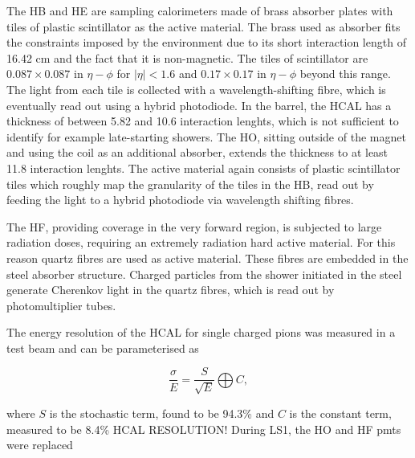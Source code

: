 The \ac{HB} and \ac{HE} are sampling calorimeters made of brass absorber
plates with tiles of plastic scintillator as the active material. The brass used as 
absorber fits the constraints imposed by the environment due to its short interaction length
of 16.42 cm and the fact that it is non-magnetic. The tiles of scintillator 
are $0.087 \times 0.087$ in $\eta-\phi$ for $|\eta|<1.6$ and $0.17\times0.17$ in $\eta-\phi$
beyond this range. 
The light from each tile is collected with a wavelength-shifting fibre, 
which is eventually read out using a hybrid photodiode. In the barrel, the \ac{HCAL}
has a thickness of between 5.82 and 10.6 interaction lenghts, which is not 
sufficient to identify for example late-starting showers. The \ac{HO}, sitting
outside of the magnet and using the coil as an additional absorber, extends the 
thickness to at least 11.8 interaction lenghts. 
The active material again consists of plastic scintillator tiles which roughly
map the granularity of the tiles in the \ac{HB}, read out by feeding the light
to a hybrid photodiode via wavelength shifting fibres.

The \ac{HF}, providing coverage in the very forward region, is 
subjected to large radiation doses, requiring an extremely
radiation hard active material. For this reason quartz
fibres are used as active material. These fibres are embedded
in the steel absorber structure. Charged particles from the
shower initiated in the steel generate Cherenkov light in 
the quartz fibres, which is read out by photomultiplier tubes.

The energy resolution of the \ac{HCAL} for single charged pions 
was measured in a test beam \cite{cms-hcalecal}
and can be parameterised as 

\begin{equation}\label{eqn:hcal_res}
\frac{\sigma}{E} = \frac{S}{\sqrt{E}} \bigoplus C,
\end{equation}

where $S$ is the stochastic term, found to be 94.3\% %
and $C$ is the constant term, measured to be 8.4\% %
HCAL RESOLUTION!
During LS1, the \ac{HO} and \ac{HF} pmts were replaced 



